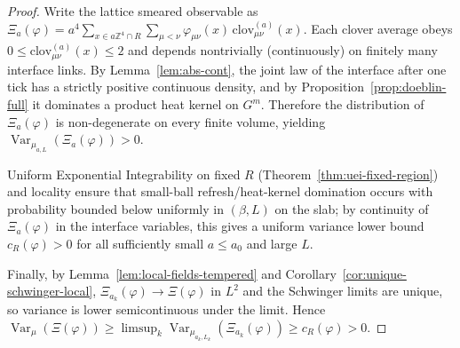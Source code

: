 \documentclass[11pt]{amsart}
\theoremstyle{plain}
\theoremstyle{definition}
\theoremstyle{remark}
\begin{document}
\begin{proof}
Write the lattice smeared observable as $\Xi_a(\varphi)=a^4\sum_{x\in a\mathbb Z^4\cap R} \sum_{\mu<\nu} \varphi_{\mu\nu}(x)\,\mathrm{clov}^{(a)}_{\mu\nu}(x)$. Each clover average obeys $0\le \mathrm{clov}^{(a)}_{\mu\nu}(x)\le 2$ and depends nontrivially (continuously) on finitely many interface links. By Lemma~\ref{lem:abs-cont}, the joint law of the interface after one tick has a strictly positive continuous density, and by Proposition~\ref{prop:doeblin-full} it dominates a product heat kernel on $G^m$. Therefore the distribution of $\Xi_a(\varphi)$ is non-degenerate on every finite volume, yielding $\operatorname{Var}_{\mu_{a,L}}(\Xi_a(\varphi))>0$.

Uniform Exponential Integrability on fixed $R$ (Theorem~\ref{thm:uei-fixed-region}) and locality ensure that small-ball refresh/heat-kernel domination occurs with probability bounded below uniformly in $(\beta,L)$ on the slab; by continuity of $\Xi_a(\varphi)$ in the interface variables, this gives a uniform variance lower bound $c_R(\varphi)>0$ for all sufficiently small $a\le a_0$ and large $L$.

Finally, by Lemma~\ref{lem:local-fields-tempered} and Corollary~\ref{cor:unique-schwinger-local}, $\Xi_{a_k}(\varphi)\to \Xi(\varphi)$ in $L^2$ and the Schwinger limits are unique, so variance is lower semicontinuous under the limit. Hence $\operatorname{Var}_\mu(\Xi(\varphi))\ge \limsup_k \operatorname{Var}_{\mu_{a_k,L_k}}(\Xi_{a_k}(\varphi))\ge c_R(\varphi)>0$.
\end{proof}
\end{document}
